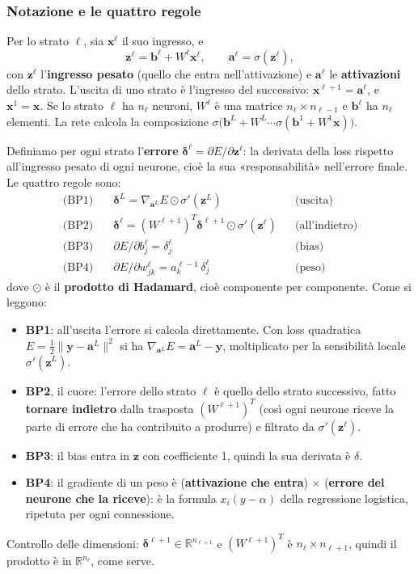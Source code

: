 \documentclass[12pt]{extarticle}
\begin{document}
\subsubsection{Notazione e le quattro regole}

\noindent Per lo strato $\ell$, sia $\mathbf{x}^\ell$ il suo ingresso, e
\[
\mathbf{z}^\ell=\mathbf{b}^\ell+W^\ell\mathbf{x}^\ell,
\qquad
\mathbf{a}^\ell=\sigma(\mathbf{z}^\ell),
\]
con $\mathbf{z}^\ell$ l'\textbf{ingresso pesato} (quello che entra nell'attivazione) e $\mathbf{a}^\ell$ le \textbf{attivazioni} dello strato. L'uscita di uno strato è l'ingresso del successivo: $\mathbf{x}^{\ell+1}=\mathbf{a}^\ell$, e $\mathbf{x}^1=\mathbf{x}$. Se lo strato $\ell$ ha $n_\ell$ neuroni, $W^\ell$ è una matrice $n_\ell\times n_{\ell-1}$ e $\mathbf{b}^\ell$ ha $n_\ell$ elementi. La rete calcola la composizione $\sigma\big(\mathbf{b}^L+W^L\cdots\sigma(\mathbf{b}^1+W^1\mathbf{x})\big)$.

\noindent Definiamo per ogni strato l'\textbf{errore} $\boldsymbol{\delta}^\ell=\partial E/\partial\mathbf{z}^\ell$: la derivata della loss rispetto all'ingresso pesato di ogni neurone, cioè la sua «responsabilità» nell'errore finale. Le quattro regole sono:
\begin{align*}
\text{(BP1)}&\quad \boldsymbol{\delta}^L=\nabla_{\mathbf{a}^L}E\odot\sigma'(\mathbf{z}^L) &&\text{(uscita)}\\
\text{(BP2)}&\quad \boldsymbol{\delta}^\ell=(W^{\ell+1})^T\boldsymbol{\delta}^{\ell+1}\odot\sigma'(\mathbf{z}^\ell) &&\text{(all'indietro)}\\
\text{(BP3)}&\quad \partial E/\partial b_j^\ell=\delta_j^\ell &&\text{(bias)}\\
\text{(BP4)}&\quad \partial E/\partial w_{jk}^\ell=a_k^{\ell-1}\,\delta_j^\ell &&\text{(peso)}
\end{align*}
dove $\odot$ è il \textbf{prodotto di Hadamard}, cioè componente per componente. Come si leggono:
\begin{itemize}
    \item \textbf{BP1}: all'uscita l'errore si calcola direttamente. Con loss quadratica $E=\frac12\|\mathbf{y}-\mathbf{a}^L\|^2$ si ha $\nabla_{\mathbf{a}^L}E=\mathbf{a}^L-\mathbf{y}$, moltiplicato per la sensibilità locale $\sigma'(\mathbf{z}^L)$.
    \item \textbf{BP2}, il cuore: l'errore dello strato $\ell$ è quello dello strato successivo, fatto \textbf{tornare indietro} dalla trasposta $(W^{\ell+1})^T$ (così ogni neurone riceve la parte di errore che ha contribuito a produrre) e filtrato da $\sigma'(\mathbf{z}^\ell)$.
    \item \textbf{BP3}: il bias entra in $\mathbf{z}$ con coefficiente 1, quindi la sua derivata è $\delta$.
    \item \textbf{BP4}: il gradiente di un peso è (\textbf{attivazione che entra}) $\times$ (\textbf{errore del neurone che la riceve}): è la formula $x_i(y-\alpha)$ della regressione logistica, ripetuta per ogni connessione.
\end{itemize}
Controllo delle dimensioni: $\boldsymbol{\delta}^{\ell+1}\in\mathbb{R}^{n_{\ell+1}}$ e $(W^{\ell+1})^T$ è $n_\ell\times n_{\ell+1}$, quindi il prodotto è in $\mathbb{R}^{n_\ell}$, come serve.
\end{document}
